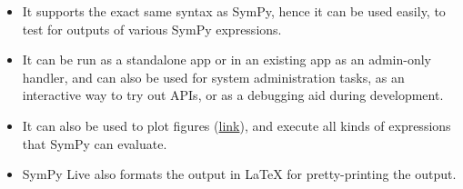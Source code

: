 \begin{itemize}
\item
  It supports the exact same syntax as SymPy, hence it can be used
  easily, to test for outputs of various SymPy expressions.
\item
  It can be run as a standalone app or in an existing app as an
  admin-only handler, and can also be used for system administration
  tasks, as an interactive way to try out APIs, or as a debugging aid
  during development.
\item
  It can also be used to plot figures (\href{http://live.sympy.org/?evaluate=from\%20sympy\%20import\%20symbols\%0Afrom\%20sympy.plotting\%20import\%20textplot\%0Ax\%20\%3D\%20symbols(\%27x\%27)\%0Atextplot(x**2\%2C0\%2C5)\%0A\%23--\%0A}{link}),
  and execute all kinds of expressions that SymPy can evaluate.
\item
SymPy Live also formats the output in LaTeX for pretty-printing the
output.
\end{itemize}
